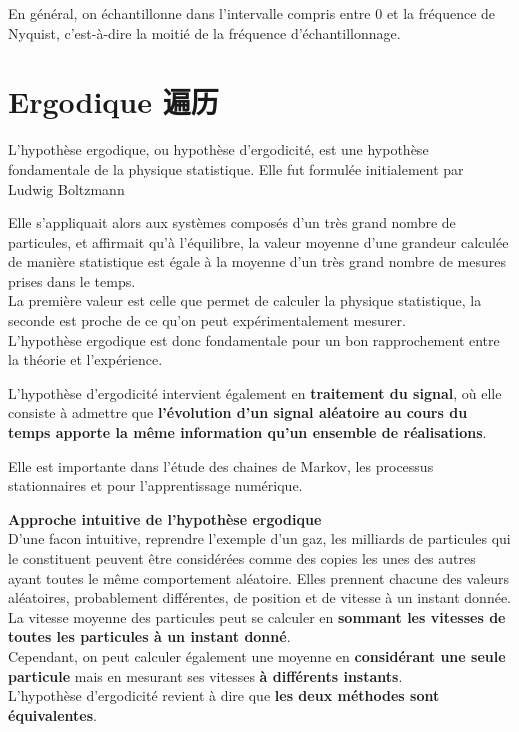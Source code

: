 \documentclass{article}
\begin{document}
En g\'en\'eral, on \'echantillonne dans l'intervalle compris entre 0 et la fr\'equence de Nyquist, c'est-\`a-dire la moiti\'e de la fr\'equence d'\'echantillonnage.

\section{Ergodique 遍历}
L'hypoth\`ese ergodique, ou hypoth\`ese d'ergodicit\'e, est une hypoth\`ese fondamentale de la physique statistique. Elle fut formul\'ee initialement par Ludwig Boltzmann

Elle s'appliquait alors aux syst\`emes compos\'es d'un tr\`es grand nombre de particules, et affirmait qu'\`a l'\'equilibre, la valeur moyenne d'une grandeur calcul\'ee de mani\`ere statistique est \'egale \`a la moyenne d'un tr\`es grand nombre de mesures prises dans le temps.\\
La premi\`ere valeur est celle que permet de calculer la physique statistique, la seconde est proche de ce qu'on peut exp\'erimentalement mesurer.\\
L'hypoth\`ese ergodique est donc fondamentale pour un bon rapprochement entre la th\'eorie et l'exp\'erience.

L'hypoth\`ese d'ergodicit\'e intervient \'egalement en \textbf{traitement du signal}, o\`u elle consiste \`a admettre que \textbf{l'\'evolution d'un signal al\'eatoire au cours du temps apporte la m\^eme information qu'un ensemble de r\'ealisations}.

Elle est importante dans l'\'etude des chaines de Markov, les processus stationnaires et pour l'apprentissage num\'erique.

\textbf{Approche intuitive de l'hypoth\`ese ergodique}\\
D'une facon intuitive, reprendre l'exemple d'un gaz, les milliards de particules qui le constituent peuvent \^etre consid\'er\'ees comme des copies les unes des autres ayant toutes le m\^eme comportement al\'eatoire. 
Elles prennent chacune des valeurs al\'eatoires, probablement diff\'erentes, de position et de vitesse \`a un instant donn\'ee. \\
La vitesse moyenne des particules peut se calculer en \textbf{sommant les vitesses de toutes les particules \`a un instant donn\'e}. \\
Cependant, on peut calculer \'egalement une moyenne en \textbf{consid\'erant une seule particule} mais en mesurant ses vitesses \textbf{\`a diff\'erents instants}.\\
L'hypoth\`ese d'ergodicit\'e revient \`a dire que \textbf{les deux m\'ethodes sont \'equivalentes}.
\end{document}
